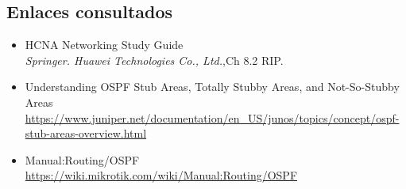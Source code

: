 \documentclass[letterpaper,12pt]{article}
\begin{document}
	\subsection{Enlaces consultados}
		\begin{itemize}
			\item{HCNA Networking Study Guide}  \\
			\textit{Springer. Huawei Technologies Co., Ltd.},Ch 8.2 RIP.
			\item{Understanding OSPF Stub Areas, Totally Stubby Areas, and Not-So-Stubby Areas}  \\
			\url{https://www.juniper.net/documentation/en_US/junos/topics/concept/ospf-stub-areas-overview.html}
			\item{Manual:Routing/OSPF}  \\
			\url{https://wiki.mikrotik.com/wiki/Manual:Routing/OSPF}
		\end{itemize}
\end{document}
